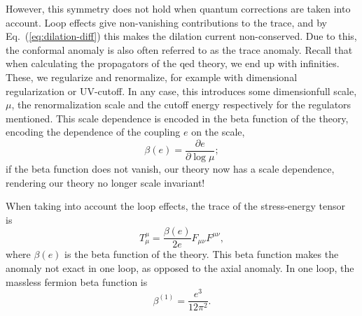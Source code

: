 However, this symmetry does not hold when quantum corrections are taken into account.
Loop effects give non-vanishing contributions to the trace, and by Eq.~(\ref{eq:dilation-diff}) this makes the dilation current non-conserved.
Due to this, the conformal anomaly is also often referred to as the trace anomaly.
Recall that when calculating the propagators of the \gls{qed} theory, we end up with infinities.
These, we regularize and renormalize, for example with dimensional regularization or UV-cutoff.
In any case, this introduces some dimensionfull scale, $\mu $, the renormalization scale and the cutoff energy respectively for the regulators mentioned.
This scale dependence is encoded in the beta function of the theory, encoding the dependence of the coupling $e$ on the scale,
\begin{equation}
  \beta (e) = \frac{\partial e}{\partial \log \mu };
\end{equation}
if the beta function does not vanish, our theory now has a scale dependence, rendering our theory no longer scale invariant!


When taking into account the loop effects, the trace of the stress-energy tensor is~\cite{kachelriessQuantumFieldsHubble2018}
\begin{equation}
  T_{\mu }^{\mu } = \frac{\beta (e)}{2 e} F_{\mu \nu }F^{\mu \nu },
\end{equation}
where $\beta (e)$ is the beta function of the theory.
This beta function makes the anomaly not exact in one loop, as opposed to the axial anomaly.
In one loop, the massless fermion beta function is~\cite{chernodubAnomalousTransportDue2016}
\begin{equation}
  \label{eq:beta-function}
  \beta ^{(1)} = \frac{e^3}{12 \pi^2}.
\end{equation}


